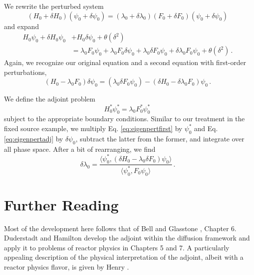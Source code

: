 We rewrite the perturbed system
\begin{equation}
 (H_0 + \delta H_0)(\psi_0 + \delta \psi_0) = (\lambda_0 + \delta \lambda_0)(F_0 + \delta F_0)(\psi_0 + \delta \psi_0) 
\end{equation}
and expand
\begin{equation}
\begin{split}
  H_0 \psi_0 + \delta H_0 \psi_0 &+ H_0 \delta \psi_0 + \theta(\delta^2) \\
      &= \lambda_0 F_0 \psi_0 + \lambda_0 F_0 \delta \psi_0 + \lambda_0 \delta F_0 \psi_0 + \delta \lambda_0 F_0 \psi_0 + \theta(\delta^2)  \, .
\end{split}
\end{equation}
Again, we recognize our original equation and a second equation with first-order perturbations,
\begin{equation}
 (H_0 - \lambda_0 F_0) \delta \psi_0 = (\lambda_0 \delta F_0 \psi_0 ) - (\delta H_0 - \delta \lambda_0 F_0)\psi_0 \, .
 \label{eq:eigenpertfirst}
\end{equation}

We define the adjoint problem
\begin{equation}
 H^*_0 \psi^*_0 = \lambda_0 F^*_0 \psi^*_0 \, 
 \label{eq:eigenpertadj}
\end{equation}
subject to the appropriate boundary conditions.  Similar to our treatment in the fixed source example, we multiply Eq. \ref{eq:eigenpertfirst} by $\psi^*_0$ and Eq. \ref{eq:eigenpertadj} by $\delta \psi_0$, subtract the latter from the former, and integrate over all phase space.  After a bit of rearranging, we find
\begin{equation}
 \delta \lambda_0 = \frac{\langle \psi^*_0,(\delta H_0 - \lambda_0 \delta F_0)\psi_0 \rangle}{\langle \psi^*_0, F_0 \psi_0 \rangle} \, .
 \label{eq:eigenpertresp}
\end{equation}

\section*{Further Reading}

Most of the development here follows that of Bell and Glasstone \cite{bell1970nrt}, Chapter 6.  Duderstadt and Hamilton \cite{duderstadt1976nra} develop the adjoint within the diffusion framework and apply it to problems of reactor physics in Chapters 5 and 7.  A particularly appealing description of the physical interpretation of the adjoint, albeit with a reactor physics flavor, is given by Henry \cite{henry1975nra}.  

